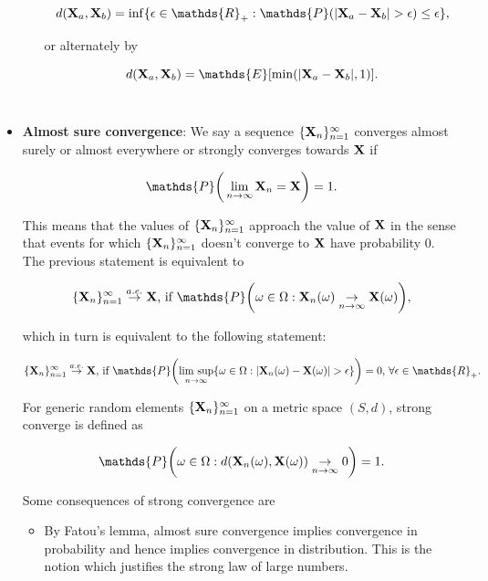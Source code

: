 \documentclass{homework}
\begin{document}
\begin{itemize}
\begin{itemize}
        $$
        d(\X_a,\X_b) = \inf \{\epsilon \in \mathds{R}_+: \mathds{P}(|\X_a-\X_b|>\epsilon) \leq \epsilon\},
        $$
        
        or alternately by 
        
        $$
        d(\X_a,\X_b) = \mathds{E}[\min(|\X_a-\X_b|,1)].
        $$ \\
        \end{itemize}
        \item \textbf{Almost sure convergence}: We say a sequence $\{{\bf X}_n\}_{n=1}^{\infty}$ converges almost surely or almost everywhere or strongly converges towards ${\bf X}$ if 
        
        $$
        \mathds{P}\bigg(\lim_{n\rightarrow \infty} \X_n = \X\bigg)=1.
        $$
        
        This means that the values of $\{{\bf X}_n\}_{n=1}^{\infty}$ approach the value of ${\bf X}$ in the sense that events for which $\{{\bf X}_n\}_{n=1}^{\infty}$ doesn't converge to ${\bf X}$ have probability 0. The previous statement is equivalent to
        
        $$
        \seq \overset{a.e.}{\rightarrow} \X \textnormal{, if } \mathds{P}\bigg( \omega \in \Omega : \X_n(\omega) \underset{n \rightarrow \infty}{\rightarrow} \X(\omega) \bigg),
        $$
        
        which in turn is equivalent to the following statement:
        
        $$
        \seq \overset{a.e.}{\rightarrow} \X \textnormal{, if } \mathds{P}\bigg(\underset{n \rightarrow \infty}{\textnormal{lim sup}}\{ \omega \in \Omega : |\X_n(\omega) -  \X(\omega)| > \epsilon \}\bigg) = 0 \textnormal{, } \forall \epsilon \in \mathds{R}_+.
        $$
        
        For generic random elements $\{{\bf X}_n\}_{n=1}^{\infty}$ on a metric space $(S,d)$, strong converge is defined as 
        
        $$
        \mathds{P}\bigg(\omega \in \Omega: d(\X_{n}(\omega),\X(\omega)) \underset{n \rightarrow \infty}{\rightarrow} 0\bigg) = 1.
        $$
        
        Some consequences of strong convergence are 
        
        \begin{itemize}
            \item By Fatou's lemma, almost sure convergence implies convergence in probability and hence implies convergence in distribution. This is the notion which justifies the strong law of large numbers. \\
        \end{itemize}
        

\end{itemize}
\end{document}
